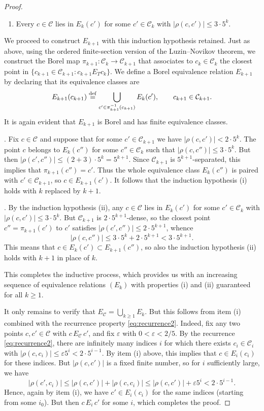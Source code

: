 \documentclass[11pt]{paper}
\newcommand{\cC}{\mathcal C}
\newcommand{\eps}{\varepsilon}
\begin{document}
\begin{proof}
\begin{enumerate}
\item[(ii)] Every $c \in\cC$ lies in $E_{k}(c')$ for some
$c'\in\cC_{k}$ with $|\rho(c, c')|\le 3\cdot 5^{k}$.
\end{enumerate}

We proceed to construct $E_{k+1}$ with this induction hypothesis retained.
Just as above, using the ordered finite-section version of the Luzin--Novikov theorem,
we construct the Borel map $\pi_{k+1}\colon \cC_{k}\to\cC_{k+1}$
that associates to $c_k\in\cC_{k}$ the closest point
in $\{c_{k+1}\in\cC_{k+1}\colon c_{k+1}E_T c_k\}$. We define a Borel equivalence relation
$E_{k+1}$ by de\-clar\-ing that its equivalence classes are
\[
E_{k+1}(c_{k+1})\overset{\rm def}{=}\bigcup_{c'\in \pi_{k+1}^{-1}(c_{k+1})}E_{k}(c'),
\qquad c_{k+1}\in \cC_{k+1}.
\]
It is again evident that $E_{k+1}$ is Borel and has finite equivalence classes.

\smallskip{}. Fix $c\in\cC$
and suppose that for some $c'\in\cC_{k+1}$ we have
$| \rho(c, c') |<2 \cdot 5^{k}$.
The point $c$ belongs to $E_{k}(c'')$ for some $c''\in\cC_{k}$ such that
$|\rho(c, c'')| \le 3\cdot 5^{k}$. But then $|\rho(c', c'')| \le (2+3)\cdot 5^{k}=5^{k+1}$.
Since $\cC_{k+1}$ is $5^{k+1}$-separated, this implies
that $\pi_{k+1}(c'')=c'$. Thus the whole equivalence class $E_{k}(c'')$ is paired
with $c'\in \cC_{k+1}$, so $c\in E_{k+1}(c')$. It follows that
the induction hypothesis (i) holds with $k$ replaced by $k+1$.

\smallskip{}.
By the induction hypothesis (ii), any $c\in \cC$ lies in $E_{k}(c')$ for some $c'\in\cC_{k}$ with
$|\rho(c, c')|\le 3\cdot 5^{k}$.
But $\cC_{k+1}$ is $2\cdot 5^{k+1}$-dense, so the closest point
$c''=\pi_{k+1}(c')$ to $c'$ satisfies $|\rho(c', c'')| \le 2\cdot 5^{k+1}$,
whence
\[
| \rho(c, c'') |\le 3\cdot 5^{k}+2\cdot 5^{k+1}< 3\cdot 5^{k+1}.
\]
This means that $c\in E_{k}(c')\subset E_{k+1}(c'')$, so also
the induction hypothesis (ii) holds with $k+1$ in place of $k$.

\smallskip This completes
the inductive process, which provides us with an increasing
sequence of equivalence relations $(E_k)$
with properties (i) and (ii) guaranteed for all $k\ge 1$.

\smallskip
It only remains to verify that $E_{\cC}=\bigcup_{k\ge 1}E_k$.
But this follows from item (i) combined with the recurrence property
\eqref{eq:recurrence2}. Indeed, fix any two points $c, c'\in\cC$ with
$c\, E_\cC\, c'$, and fix $\eps$ with $0<\eps<2/5$.
By the recurrence \eqref{eq:recurrence2},
there are infinitely many indices $i$ for which there exists $c_i\in\cC_i$
with $| \rho(c, c_i)| \le \eps 5^i < 2\cdot 5^{i-1}$. By item (i) above, this implies that
$c\in E_{i}(c_i)$ for these indices. But $| \rho(c, c')|$
is a fixed finite number, so for $i$ sufficiently large, we have
\[
| \rho(c', c_{i}) | \le |\rho(c, c')| + |\rho(c, c_i)| \le |\rho(c, c')| +\eps 5^{i} < 2\cdot 5^{i-1}.
\]
Hence, again by item (i), we have $c'\in E_{i}(c_{i})$ for the same indices
(starting from some $i_0$).
But then $c\, E_{i}\, c'$ for some $i$, which completes the proof.



\end{proof}
\end{document}
